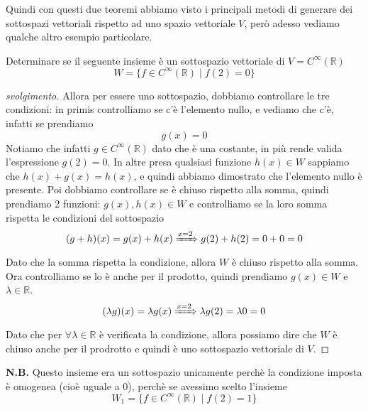 \documentclass{rapport}
\begin{document}
Quindi con questi due teoremi abbiamo visto i principali metodi di generare dei sottospazi vettoriali rispetto ad uno spazio vettoriale $V$, però adesso vediamo qualche altro esempio particolare. 
\begin{esercizio}{}{}
  Determinare se il seguente insieme è un sottospazio vettoriale di $V= C^{\infty}(\mathbb{R})$
  \[
  W = \{f \in C^{\infty}(\mathbb{R}) \;|\; f(2)=0\}
  \]
\end{esercizio}
\begin{proof}[svolgimento]
  Allora per essere uno sottospazio, dobbiamo controllare le tre condizioni: in primis controlliamo se c'è l'elemento nullo, e vediamo che c'è, infatti se prendiamo 
  \[
  g(x) = 0
  \]
  Notiamo che infatti $g \in C^{\infty}(\mathbb{R})$ dato che è una costante, in più rende valida l'espressione $g(2) = 0$. In altre presa qualsiasi funzione $h(x) \in W$ sappiamo che $h(x) + g(x) =  h(x)$, e quindi abbiamo dimostrato che l'elemento nullo è presente. Poi dobbiamo controllare se è chiuso rispetto alla somma, quindi prendiamo 2 funzioni: $g(x), h(x) \in W$ e controlliamo se la loro somma rispetta le condizioni del sottospazio
  \[
  (g+ h)(x) = g(x) + h(x) \xRightarrow{x=2} g(2) + h(2) = 0 + 0 = 0 
  \]
  Dato che la somma rispetta la condizione, allora $W$ è chiuso rispetto alla somma. Ora controlliamo se lo è anche per il prodotto, quindi prendiamo $g(x)\in W$ e $\lambda \in \mathbb{R}$. 
  \[
  (\lambda g)(x) = \lambda g(x)  \xRightarrow{x=2} \lambda g(2) = \lambda 0 = 0 
  \]
  Dato che per $\forall \lambda \in \mathbb{R}$ è verificata la condizione, allora possiamo dire che $W$ è chiuso anche per il prodrotto e quindi è uno sottospazio vettoriale di $V$. 

\end{proof}

  \textbf{N.B.} Questo insieme era un sottospazio unicamente perchè la condizione imposta è omogenea (cioè uguale a 0), perchè se avessimo scelto l'insieme 
  \[
  W_1 = \{f \in C^{\infty}(\mathbb{R}) \;|\; f(2)=1\}
  \]
\end{document}

